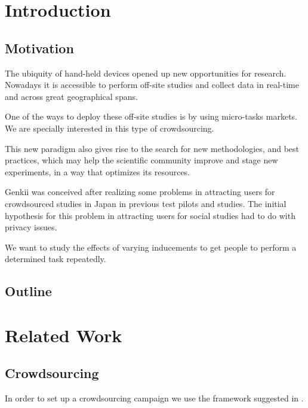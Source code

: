 \documentclass[letterpaper]{article}
\begin{document}
\section{Introduction}

\subsection{Motivation}



The ubiquity of hand-held devices opened up new opportunities for research. Nowadays it is accessible to perform off-site studies and collect data in real-time and across great geographical spans.

One of the ways to deploy these off-site studies is by using micro-tasks markets. We are specially interested in this type of crowdsourcing.

This new paradigm also gives rise to the search for new methodologies, and best practices, which may help the scientific community improve and stage new experiments, in a way that optimizes its resources.



Genkii was conceived after realizing some problems in attracting users for crowdsourced studies in Japan in previous test pilots and studies. The initial hypothesis for this problem in attracting users for social studies had to do with privacy issues.

We want to study the effects of varying inducements to get people to perform a determined task repeatedly.

\subsection{Outline}

\section{Related Work}
\subsection{Crowdsourcing}
\label{subsec:Crowdsourcing}

In order to set up a crowdsourcing campaign we use the framework suggested in \cite{Henze2013}.
\end{document}
